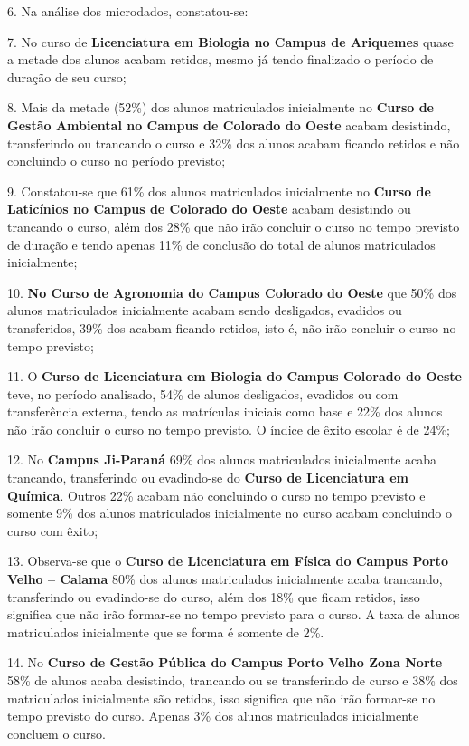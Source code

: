\documentclass[article,12pt,onesidea,4paper,english,brazil]{abntex2}
\begin{document}
	6. Na análise dos microdados, constatou-se:
	
	7. No curso de \textbf{Licenciatura em Biologia no Campus de Ariquemes} quase a metade dos
	alunos acabam retidos, mesmo já tendo finalizado o período de duração de seu curso;
	
	8. Mais da metade (52\%) dos alunos matriculados inicialmente no \textbf{Curso de Gestão
	Ambiental no Campus de Colorado do Oeste} acabam desistindo, transferindo ou
	trancando o curso e 32\% dos alunos acabam ficando retidos e não concluindo o curso no
	período previsto;
	
	9. Constatou-se que 61\% dos alunos matriculados inicialmente no \textbf{Curso de Laticínios no
	Campus de Colorado do Oeste} acabam desistindo ou trancando o curso, além dos 28\%
	que não irão concluir o curso no tempo previsto de duração e tendo apenas 11\% de
	conclusão do total de alunos matriculados inicialmente;
	
	10. \textbf{No Curso de Agronomia do Campus Colorado do Oeste} que 50\% dos alunos
	matriculados inicialmente acabam sendo desligados, evadidos ou transferidos, 39\% dos
	acabam ficando retidos, isto é, não irão concluir o curso no tempo previsto;
	
	11. O \textbf{Curso de Licenciatura em Biologia do Campus Colorado do Oeste} teve, no período
	analisado, 54\% de alunos desligados, evadidos ou com transferência externa, tendo as
	matrículas iniciais como base e 22\% dos alunos não irão concluir o curso no tempo
	previsto. O índice de êxito escolar é de 24\%;
	
	12. No \textbf{Campus Ji-Paraná} 69\% dos alunos matriculados inicialmente acaba trancando,
	transferindo ou evadindo-se do \textbf{Curso de Licenciatura em Química}. Outros 22\% acabam
	não concluindo o curso no tempo previsto e somente 9\% dos alunos matriculados
	inicialmente no curso acabam concluindo o curso com êxito;
	
	13. Observa-se que o\textbf{ Curso de Licenciatura em Física do Campus Porto Velho – Calama}
	80\% dos alunos matriculados inicialmente acaba trancando, transferindo ou evadindo-se
	do curso, além dos 18\% que ficam retidos, isso significa que não irão formar-se no tempo
	previsto para o curso. A taxa de alunos matriculados inicialmente que se forma é somente
	de 2\%.
	
	14. No \textbf{Curso de Gestão Pública do Campus Porto Velho Zona Norte} 58\% de alunos
	acaba desistindo, trancando ou se transferindo de curso e 38\% dos matriculados
	inicialmente são retidos, isso significa que não irão formar-se no tempo previsto do curso.
	Apenas 3\% dos alunos matriculados inicialmente concluem o curso.
	
\end{document}
